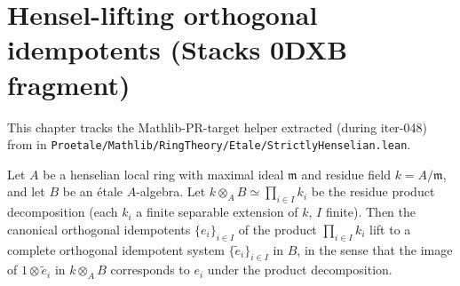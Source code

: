 \chapter{Hensel-lifting orthogonal idempotents (Stacks 0DXB fragment)}
\label{chap:Mathlib_RingTheory_Etale_HenselianIdempotentLift}

This chapter tracks the Mathlib-PR-target helper
extracted (during iter-048) from
 in
\texttt{Proetale/Mathlib/RingTheory/Etale/StrictlyHenselian.lean}.

\begin{theorem}
  \label{thm:etale-henselian-cop-lift}
  \leanok
  Let $A$ be a henselian local ring with maximal ideal $\mathfrak{m}$
  and residue field $k = A/\mathfrak{m}$, and let $B$ be an étale
  $A$-algebra. Let $k \otimes_A B \simeq \prod_{i \in I} k_i$ be the
  residue product decomposition (each $k_i$ a finite separable
  extension of $k$, $I$ finite). Then the canonical orthogonal
  idempotents $\{e_i\}_{i \in I}$ of the product $\prod_{i \in I} k_i$
  lift to a complete orthogonal idempotent system
  $\{\tilde e_i\}_{i \in I}$ in $B$, in the sense that the image of
  $1 \otimes \tilde e_i$ in $k \otimes_A B$ corresponds to $e_i$
  under the product decomposition.
\end{theorem}

